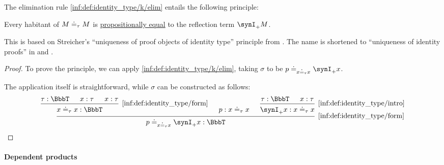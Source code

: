 \begin{theorem}\label{thm:uniqueness_of_identity_proofs}
  The elimination rule \ref{inf:def:identity_type/k/elim} entails the following principle:
  \begin{displayquote}
    Every habitant of \( M \doteq_\tau M \) is \hyperref[def:mltt_propositional_equality]{propositionally equal} to the reflection term \( \synI_+ M \).
  \end{displayquote}
\end{theorem}
\begin{comments}
  \item This is based on Streicher's \enquote{uniqueness of proof objects of identity type} principle from \cite[37; 38]{Streicher1993IntensionalTypeTheory}. The name is shortened to \enquote{uniqueness of identity proofs} in \cite[55]{UnivalentFoundationsProgram2024OctoberHoTT} and \cite[\S 9.1.6]{Mimram2020ProgramEqualsProof}.
\end{comments}
\begin{proof}
  To prove the principle, we can apply \ref{inf:def:identity_type/k/elim}, taking \( \sigma \) to be \( p \syneq_{x \syneq_\tau x} \synI_+ x \).

  The application itself is straightforward, while \( \sigma \) can be constructed as follows:
  \begin{equation*}
    \begin{prooftree}
      \hypo{ \tau: \BbbT }
      \hypo{ x: \tau }
      \hypo{ x: \tau }
      \infer3[\ref{inf:def:identity_type/form}]{x \syneq_\tau x: \BbbT}

      \hypo{ p: x \syneq_\tau x }

      \hypo{ \tau: \BbbT }
      \hypo{ x: \tau }
      \infer2[\ref{inf:def:identity_type/intro}]{ \synI_+ x: x \syneq_\tau x }

      \infer3[\ref{inf:def:identity_type/form}]{p \syneq_{x \syneq_\tau x} \synI_+ x: \BbbT}
    \end{prooftree}
  \end{equation*}
\end{proof}

\paragraph{Dependent products}

